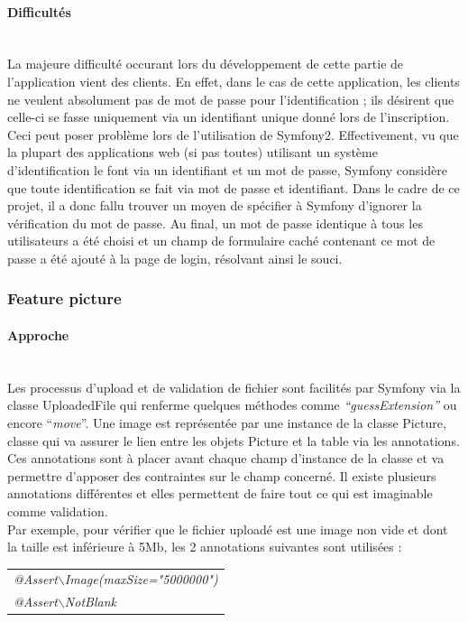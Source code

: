 \documentclass{article}
\begin{document}
\begin{sffamily}
\paragraph{Difficultés}$ $\\

La majeure difficulté occurant lors du développement de cette partie de l'application vient des clients. En effet, dans le cas de cette application, les clients ne veulent 
absolument pas de mot de passe pour l'identification ; ils désirent que celle-ci se fasse uniquement via un identifiant unique donné lors de l'inscription. Ceci peut poser 
problème lors de l'utilisation de Symfony2. Effectivement, vu que la plupart des applications web (si pas toutes) utilisant un système d'identification le font via un 
identifiant et un mot de passe, Symfony considère que toute identification se fait via mot de passe et identifiant. Dans le cadre de ce projet, il a donc fallu trouver un 
moyen de spécifier à Symfony d'ignorer la vérification du mot de passe. Au final, un mot de passe identique à tous les utilisateurs a été choisi et un champ de formulaire 
caché contenant ce mot de passe a été ajouté à la page de login, résolvant ainsi le souci.

\subsubsection{Feature picture}

\paragraph{Approche}$ $\\

Les processus d'upload et de validation de fichier sont facilités par Symfony via la classe UploadedFile qui renferme quelques méthodes comme \textit{``guessExtension''} ou 
encore ``\textit{move}''. Une image est représentée par une instance de la classe Picture, classe qui va assurer le lien entre les 
objets Picture et la table  via les annotations. Ces annotations sont à placer avant chaque champ d'instance de la classe et va permettre d'apposer des 
contraintes sur le champ concerné. Il existe plusieurs annotations différentes et elles permettent de faire tout ce qui est imaginable comme validation.\\
Par exemple, pour vérifier que le fichier uploadé est une image non vide et dont la taille est inférieure à 5Mb, les 2 annotations suivantes sont utilisées :
\begin{tabular}{l}
\textit{@Assert$\backslash$Image(maxSize="5000000")}\\
\textit{@Assert$\backslash$NotBlank}
\end{tabular}


\end{sffamily}
\end{document}
